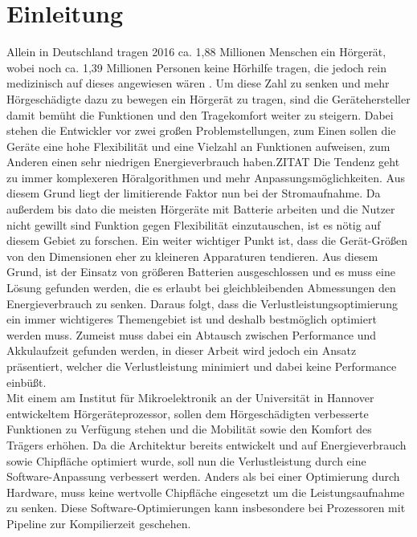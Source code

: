 
\thispagestyle{empty}
%
\chapter{Einleitung}
\label{chap:introduction}
Allein in Deutschland tragen 2016 ca. 1,88 Millionen Menschen ein Hörgerät, wobei noch ca. 1,39 Millionen Personen keine Hörhilfe tragen, die jedoch rein medizinisch auf dieses angewiesen wären \cite{statistica}. Um diese Zahl zu senken und mehr Hörgeschädigte dazu zu bewegen ein Hörgerät zu tragen, sind die Gerätehersteller damit bemüht die Funktionen und den Tragekomfort weiter zu steigern.
Dabei stehen die Entwickler vor zwei großen Problemstellungen, zum Einen sollen die Geräte eine hohe Flexibilität und eine Vielzahl an Funktionen aufweisen, zum Anderen einen sehr niedrigen Energieverbrauch haben.ZITAT Die Tendenz geht zu immer komplexeren Höralgorithmen und mehr Anpassungsmöglichkeiten. Aus diesem Grund liegt der limitierende Faktor nun bei der Stromaufnahme.
Da außerdem bis dato die meisten Hörgeräte mit Batterie arbeiten und die Nutzer nicht gewillt sind Funktion gegen Flexibilität einzutauschen, ist es nötig auf diesem Gebiet zu forschen. Ein weiter wichtiger Punkt ist, dass die Gerät-Größen von den Dimensionen eher zu kleineren Apparaturen tendieren. Aus diesem Grund, ist der Einsatz von größeren Batterien ausgeschlossen und es muss eine Lösung gefunden werden, die es erlaubt bei gleichbleibenden Abmessungen den Energieverbrauch zu senken. Daraus folgt, dass die Verlustleistungsoptimierung ein immer wichtigeres Themengebiet ist und deshalb bestmöglich optimiert werden muss. 
Zumeist muss dabei ein Abtausch zwischen Performance und Akkulaufzeit gefunden werden, in dieser Arbeit wird jedoch ein Ansatz präsentiert, welcher die Verlustleistung minimiert und dabei keine Performance einbüßt.\\
Mit einem am Institut für Mikroelektronik an der Universität in Hannover entwickeltem Hörgeräteprozessor, sollen dem Hörgeschädigten verbesserte Funktionen zu Verfügung stehen und die Mobilität sowie den Komfort des Trägers erhöhen. Da die Architektur bereits entwickelt und auf Energieverbrauch sowie Chipfläche optimiert wurde, soll nun die Verlustleistung durch eine Software-Anpassung verbessert werden. Anders als bei einer Optimierung durch Hardware, muss keine wertvolle Chipfläche eingesetzt um die Leistungsaufnahme zu senken. Diese Software-Optimierungen kann insbesondere bei Prozessoren mit Pipeline zur Kompilierzeit geschehen.\\
